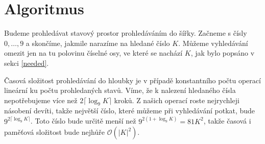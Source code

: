 \documentclass{article}
\begin{document}
\section{Algoritmus}

Budeme prohledávat stavový prostor prohledáváním do šířky. Začneme s čísly $0, \dots, 9$ a skončíme, jakmile narazíme na hledané číslo $K$. Můžeme vyhledávání omezit jen na tu polovinu číselné osy, ve které se nachází $K$, jak bylo popsáno v sekci \ref{needed}.

Časová složitost prohledávání do hloubky je v případě konstantního počtu operací lineární ku počtu prohledaných stavů. Víme, že k nalezení hledaného čísla nepotřebujeme více než $2\lceil\log_9 K\rceil$ kroků. Z našich operací roste nejrychleji násobení devíti, takže největší číslo, které můžeme při vyhledávání potkat, bude $9^{2\lceil\log_9 K\rceil}$. Toto číslo bude určitě menší než $9^{2 \left(1 + \log_9 K\right)} = 81 K^2$, takže časová i paměťová složitost bude nejhůře $\mathcal{O}\left(\lvert K \rvert^2\right)$.
\end{document}
